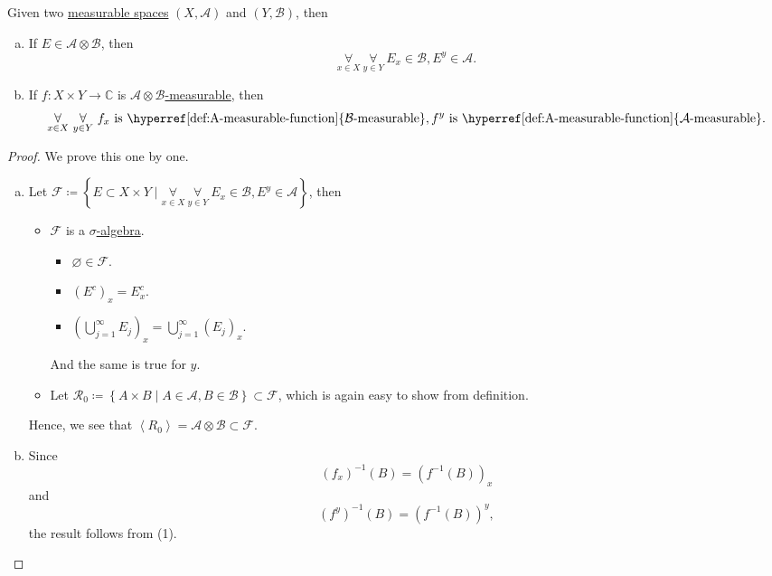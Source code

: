 \begin{proposition}
	Given two \hyperref[def:measurable-space]{measurable spaces} \((X, \mathcal{A} )\) and \((Y, \mathcal{B} )\), then
	\begin{enumerate}[(a)]
		\item If \(E\in \mathcal{A} \otimes \mathcal{B}\), then
		      \[
			      \underset{x\in X}{\forall }\ \underset{y\in Y}{\forall }\ E_x\in \mathcal{B} , E^y\in \mathcal{A}.
		      \]
		\item If \(f\colon X\times Y\to \mathbb{C} \) is \hyperref[def:A-measurable-function]{\(\mathcal{A} \otimes \mathcal{B} \)-measurable}, then
		      \[
			      \underset{x\in X}{\forall }\ \underset{y\in Y}{\forall }\ f_x \text{ is \hyperref[def:A-measurable-function]{\(\mathcal{B}\)-measurable}}, f^y \text{ is \hyperref[def:A-measurable-function]{\(\mathcal{A}\)-measurable}}.
		      \]
	\end{enumerate}
\end{proposition}
\begin{proof}
	We prove this one by one.
	\begin{enumerate}[(a)]
		\item Let \(\mathcal{F} \coloneqq \left\{E\subset X\times Y \mid \underset{x\in X}{\forall }\ \underset{y\in Y}{\forall }\ E_x\in \mathcal{B} , E^y\in \mathcal{A}\right\}\), then
		      \begin{itemize}
			      \item \(\mathcal{F} \) is a \hyperref[def:sigma-algebra]{\(\sigma\)-algebra}.
			            \begin{itemize}
				            \item \(\varnothing \in \mathcal{F} \).
				            \item \((E^{c} )_x = E_{x}^{c}\).
				            \item \(\left(\bigcup_{j=1}^{\infty} E_{j} \right)_x = \bigcup_{j=1}^{\infty} (E_{j} )_{x} \).
			            \end{itemize}
			            And the same is true for \(y\).
			      \item Let \(\mathcal{R} _0 \coloneqq \left\{A\times B \mid A\in \mathcal{A} , B\in \mathcal{B} \right\}\subset \mathcal{F}\), which is again
			            easy to show from definition.
		      \end{itemize}
		      Hence, we see that \(\left< R_0 \right> = \mathcal{A} \otimes \mathcal{B} \subset \mathcal{F} \).
		\item Since
		      \[
			      (f_{x} )^{-1} (B) = (f^{-1} (B))_{x}
		      \]
		      and
		      \[
			      (f^{y} )^{-1} ({B} ) = (f^{-1} (B))^{y},
		      \]
		      the result follows from (1).
	\end{enumerate}
\end{proof}

